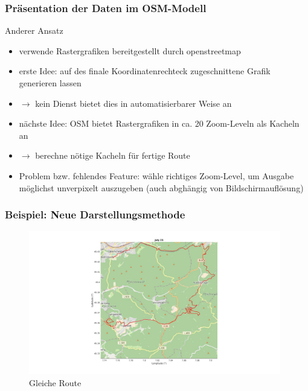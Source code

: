 \documentclass[aspectratio=43]{beamer}
\begin{document}
\begin{frame}
    \frametitle{Präsentation der Daten im OSM-Modell}
    Anderer Ansatz
    \begin{itemize}
        \item verwende Rastergrafiken bereitgestellt durch openstreetmap
        \item erste Idee: auf des finale Koordinatenrechteck zugeschnittene Grafik
            generieren lassen
        \item[] $\rightarrow$ kein Dienst bietet dies in automatisierbarer Weise an
        \item nächste Idee: OSM bietet Rastergrafiken in ca. 20 Zoom-Leveln als Kacheln an
        \item[] $\rightarrow$ berechne nötige Kacheln für fertige Route
        \item Problem bzw. fehlendes Feature: wähle richtiges Zoom-Level, um Ausgabe
            möglichst unverpixelt auszugeben (auch abghängig von Bildschirmauflösung)
    \end{itemize}
\end{frame}

\begin{frame}
    \frametitle{Beispiel: Neue Darstellungsmethode}
    \begin{figure}[t]
        \centering
        \includegraphics[width=0.98\textwidth]{bilder/ele.jpg}
        \caption{Gleiche Route}
    \end{figure}
\end{frame}
\end{document}
